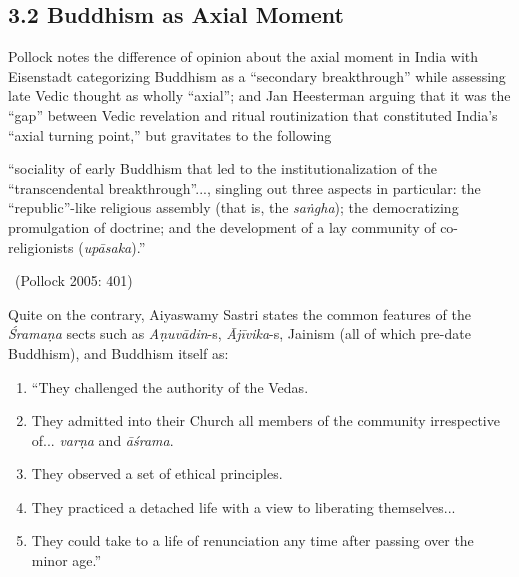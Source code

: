 \subsection*{3.2 Buddhism as Axial Moment}

Pollock notes the difference of opinion about the axial moment in India with Eisenstadt categorizing Buddhism as a “secondary breakthrough” while assessing late Vedic thought as wholly “axial”; and Jan Heesterman arguing that it was the “gap” between Vedic revelation and ritual routinization that constituted India’s “axial turning point,” but gravitates to the following

\begin{myquote}
“sociality of early Buddhism that led to the institutionalization of the “transcendental breakthrough”..., singling out three aspects in particular: the “republic”-like religious assembly (that is, the \textit{saṅgha}); the democratizing promulgation of doctrine; and the development of a lay community of co-religionists (\textit{upāsaka}).” 

~\hfill (Pollock 2005: 401)
\end{myquote}

Quite on the contrary, Aiyaswamy Sastri states the common features of the \textit{Śramaṇa} sects such as \textit{Aṇuvādin}-s, \textit{Ājīvika}-s, Jainism (all of which pre-date Buddhism), and Buddhism itself as:

\begin{enumerate}
\itemsep=0pt
\item “They challenged the authority of the Vedas.

 \item They admitted into their Church all members of the community irrespective of... \textit{varṇa} and \textit{āśrama}.

 \item They observed a set of ethical principles.

 \item They practiced a detached life with a view to liberating themselves...

 \item They could take to a life of renunciation any time after passing over the minor age.”

\end{enumerate}

